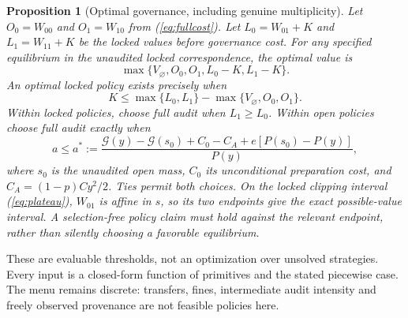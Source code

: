 \documentclass[11pt]{article}
\newtheorem{proposition}[theorem]{Proposition}
\begin{document}
\begin{proposition}[Optimal governance, including genuine multiplicity]\label{prop:menu}
Let $O_0=W_{00}$ and $O_1=W_{10}$ from (\ref{eq:fullcost}). Let $L_0=W_{01}+K$ and $L_1=W_{11}+K$ be the locked values before governance cost. For any specified equilibrium in the unaudited locked correspondence, the optimal value is
\begin{equation}\max\{V_\varnothing,O_0,O_1,L_0-K,L_1-K\}.\label{eq:menu}
\end{equation}
An optimal locked policy exists precisely when
\begin{equation}K\leq\max\{L_0,L_1\}-\max\{V_\varnothing,O_0,O_1\}.\label{eq:kglobal}
\end{equation}
Within locked policies, choose full audit when $L_1\geq L_0$. Within open policies choose full audit exactly when
\begin{equation}
a\leq a^*:=\frac{\mathcal G(y)-\mathcal G(s_0)+C_0-C_A+e[P(s_0)-P(y)]}{P(y)},\label{eq:afees}
\end{equation}
where $s_0$ is the unaudited open mass, $C_0$ its unconditional preparation cost, and $C_A=(1-p)Cy^2/2$. Ties permit both choices. On the locked clipping interval (\ref{eq:plateau}), $W_{01}$ is affine in $s$, so its two endpoints give the exact possible-value interval. A selection-free policy claim must hold against the relevant endpoint, rather than silently choosing a favorable equilibrium.
\end{proposition}
These are evaluable thresholds, not an optimization over unsolved strategies. Every input is a closed-form function of primitives and the stated piecewise case. The menu remains discrete: transfers, fines, intermediate audit intensity and freely observed provenance are not feasible policies here.
\end{document}
